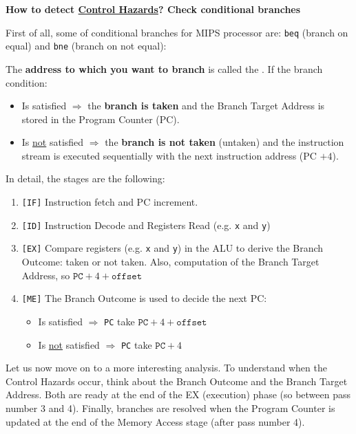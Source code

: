 \begin{flushleft}
    \textcolor{Green3}{ \textbf{How to detect \underline{Control Hazards}? Check conditional branches}}
    \label{flushleft: how to detect Control Hazards}
\end{flushleft}
First of all, some  of conditional branches for MIPS processor are: \texttt{beq} (branch on equal) and \texttt{bne} (branch on not equal):

The \textbf{address to which you want to branch} is called the . If the branch condition:
\begin{itemize}
    \item Is satisfied $\Rightarrow$ the \textbf{branch is taken} and the Branch Target Address is stored in the Program Counter (PC).

    \item Is \underline{not} satisfied $\Rightarrow$ the \textbf{branch is not taken} (untaken) and the instruction stream is executed sequentially with the next instruction address (PC $+ 4$).
\end{itemize}
In detail, the stages are the following:
\begin{enumerate}
    \item \texttt{[IF]} Instruction fetch and PC increment.
    \item \texttt{[ID]} Instruction Decode and Registers Read (e.g. \texttt{x} and \texttt{y})
    \item \texttt{[EX]} Compare registers (e.g. \texttt{x} and \texttt{y}) in the ALU to derive the Branch Outcome: taken or not taken. Also, computation of the Branch Target Address, so $\texttt{PC} + 4 + \texttt{offset}$
    \item \texttt{[ME]} The Branch Outcome is used to decide the next PC:
    \begin{itemize}
        \item Is satisfied $\Rightarrow$ \texttt{PC} take $\texttt{PC} + 4 + \texttt{offset}$
        \item Is \underline{not} satisfied $\Rightarrow$ \texttt{PC} take $\texttt{PC} + 4$
    \end{itemize}
\end{enumerate}
Let us now move on to a more interesting analysis. To understand when the Control Hazards occur, think about the Branch Outcome and the Branch Target Address. Both are ready at the end of the EX (execution) phase (so between pass number 3 and 4). Finally, branches are resolved when the Program Counter is updated at the end of the Memory Access stage (after pass number 4). 

